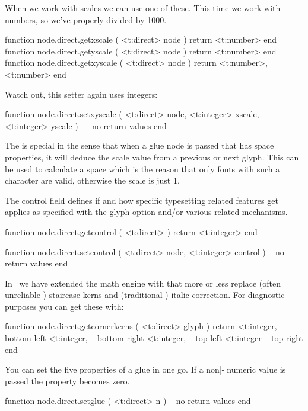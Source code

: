 When we work with scales we can use one of these. This time we work
with numbers, so we've properly divided by 1000.

\starttyping[option=LUA]
function node.direct.getxscale  ( <t:direct> node )
    return <t:number>
end
function node.direct.getyscale  ( <t:direct> node )
    return <t:number>
end
function node.direct.getxyscale ( <t:direct> node )
    return <t:number>,  <t:number>
end
\stoptyping

Watch out, this setter again uses integers:

\starttyping[option=LUA]
function node.direct.setxyscale (
    <t:direct>  node,
    <t:integer> xscale,
    <t:integer> yscale
)
    --- no return values
end
\stoptyping

The  is special in the sense that when a glue node is passed
that has space properties, it will deduce the scale value from a previous or next
glyph. This can be used to calculate a space which is the reason that only fonts
with such a character are valid, otherwise the scale is just 1.

The control field defines if and how specific typesetting related features get
applies as specified with the glyph option and/or various related mechanisms.

\starttyping[option=LUA]
function node.direct.getcontrol (
    <t:direct>
)
    return <t:integer>
end

function node.direct.setcontrol (
    <t:direct>  node,
    <t:integer> control
)
    -- no return values
end
\stoptyping

In \LUAMETATEX\ we have extended the math engine with  that
more or less replace (often unreliable \OPENTYPE) staircase kerns and
(traditional \TEX) italic correction. For diagnostic purposes you can get these
with:

\starttyping[option=LUA]
function node.direct.getcornerkerns (
    <t:direct> glyph
)
    return
        <t:integer, -- bottom left
        <t:integer, -- bottom right
        <t:integer, -- top left
        <t:integer  -- top right
end
\stoptyping

\stopsubsection

\startsubsection[title={Glue}]

You can set the five properties of a glue in one go. If a non|-|numeric value is
passed the property becomes zero.

\starttyping[option=LUA]
function node.direct.setglue ( <t:direct> n )
    -- no return values
end

